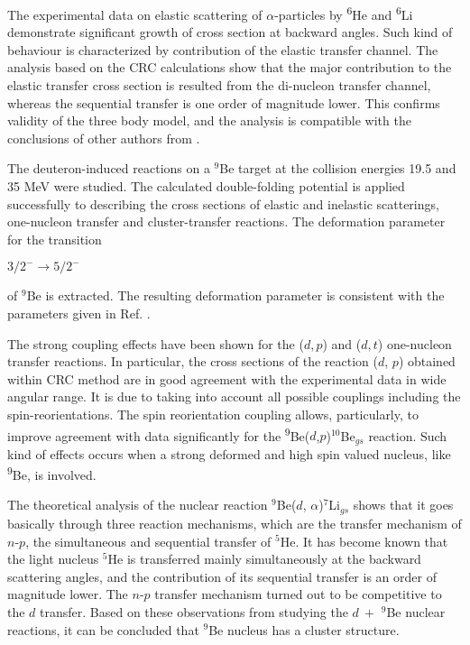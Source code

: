 \documentclass[
12pt, %
oneside, %
english, %
doublespacing, %
doublespacing, %
toctotoc, %
parskip, %
headsepline, %
]{MastersDoctoralThesis} %
\newcommand{\he}{\textsuperscript{6}He\xspace}
\newcommand{\li}{\textsuperscript{6}Li\xspace}
\newcommand{\be}{\textsuperscript{9}Be\xspace}
\begin{document}
  The experimental data on elastic scattering of $\alpha$-particles by \he and \li  demonstrate significant growth of cross section at backward angles.
   Such kind of behaviour is characterized by contribution of the elastic transfer channel. 
The analysis based on the CRC calculations show that the major contribution to the elastic transfer cross section is resulted from the di-nucleon transfer channel, whereas the sequential transfer is one order of magnitude lower.
This confirms validity of the three body model, and the analysis is compatible with the conclusions of other authors from \cite{khoa2004di, oganessian1999dynamics}. 
 

The deuteron-induced reactions on a ${}^9$Be target at the collision energies 19.5 and 35 MeV were studied.
The calculated double-folding potential is applied successfully to describing the cross sections of elastic and inelastic scatterings, one-nucleon  transfer and cluster-transfer reactions.
  The deformation parameter for the transition \begin{small}
  $3/2^-\rightarrow5/2^-$
\end{small}  of ${}^9$Be is extracted. The resulting deformation parameter is consistent with the parameters given in Ref. \cite{lukyanov2014study, harakeh1980strong}.

 The strong coupling effects have been shown for the ($d,p$) and ($d,t$) one-nucleon transfer reactions. 
In particular, the cross sections of the reaction ($d$, $p$) obtained  within CRC method are in good agreement with the experimental data in wide angular range. 
It is due to  taking into account all possible couplings including the spin-reorientations. 
The spin reorientation coupling allows, particularly, to improve agreement with data significantly for the \be($d$,$p$)${}^{10}$Be${}_{gs}$ reaction. 
 Such kind of effects occurs when a strong deformed and high spin valued nucleus, like \be, is involved. 

The theoretical analysis of the nuclear reaction ${}^9$Be($d$, $\alpha$)${}^7$Li$_{gs}$ shows that it goes basically through three reaction mechanisms, which are the transfer mechanism of $n$-$p$,  the simultaneous and sequential transfer of $^5$He.  It has become known that the light nucleus ${}^5$He is transferred mainly simultaneously at the backward scattering angles, and the contribution of its sequential transfer is an order of magnitude lower.
The $n$-$p$ transfer mechanism turned out to be competitive to the $d$ transfer.
 Based on these observations from studying the  $d~+$ $^9$Be nuclear reactions, it can be concluded that $^9$Be  nucleus has a cluster structure.
 
\end{document}
